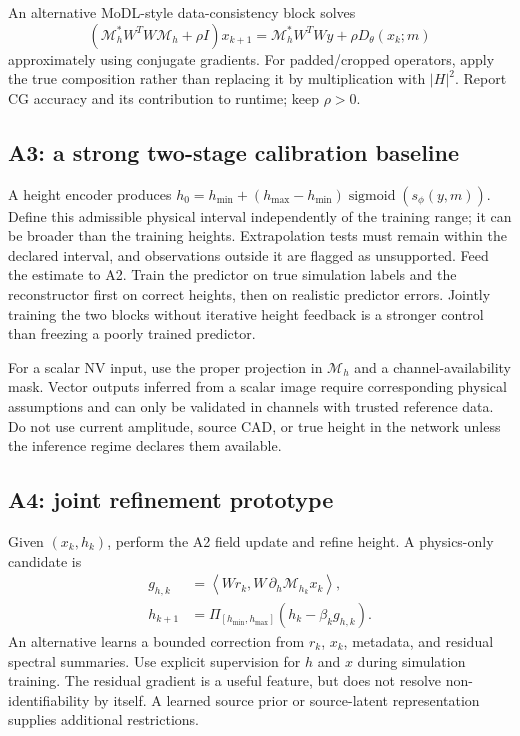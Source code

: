 An alternative MoDL-style data-consistency block solves
\begin{equation}
 (\mathcal M_h^*W^TW\mathcal M_h+\rho I)x_{k+1}
 =\mathcal M_h^*W^TW y+\rho D_\theta(x_k;m)
\end{equation}
approximately using conjugate gradients. For padded/cropped operators, apply the true composition rather than replacing it by multiplication with $|H|^2$. Report CG accuracy and its contribution to runtime; keep $\rho>0$.

\subsection{A3: a strong two-stage calibration baseline}
A height encoder produces $h_0=h_{\min}+(h_{\max}-h_{\min})\operatorname{sigmoid}(s_\phi(y,m))$. Define this admissible physical interval independently of the training range; it can be broader than the training heights. Extrapolation tests must remain within the declared interval, and observations outside it are flagged as unsupported. Feed the estimate to A2. Train the predictor on true simulation labels and the reconstructor first on correct heights, then on realistic predictor errors. Jointly training the two blocks without iterative height feedback is a stronger control than freezing a poorly trained predictor.

For a scalar NV input, use the proper projection in $\mathcal M_h$ and a channel-availability mask. Vector outputs inferred from a scalar image require corresponding physical assumptions and can only be validated in channels with trusted reference data. Do not use current amplitude, source CAD, or true height in the network unless the inference regime declares them available.

\subsection{A4: joint refinement prototype}
Given $(x_k,h_k)$, perform the A2 field update and refine height. A physics-only candidate is
\begin{align}
 g_{h,k}&=\left\langle W r_k,W\,\partial_h\mathcal M_{h_k}x_k\right\rangle,\\
 h_{k+1}&=\Pi_{[h_{\min},h_{\max}]}(h_k-\beta_k g_{h,k}).
\end{align}
An alternative learns a bounded correction from $r_k$, $x_k$, metadata, and residual spectral summaries. Use explicit supervision for $h$ and $x$ during simulation training. The residual gradient is a useful feature, but does not resolve non-identifiability by itself. A learned source prior or source-latent representation supplies additional restrictions.

